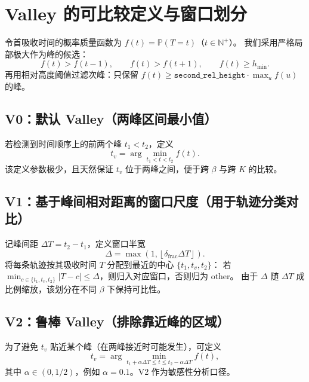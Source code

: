 \section{Valley 的可比较定义与窗口划分}

令首吸收时间的概率质量函数为 $f(t)=\mathbb{P}(T=t)$（$t\in\mathbb{N}^+$）。
我们采用严格局部极大作为峰的候选：
\begin{equation}
f(t)>f(t-1),\qquad f(t)>f(t+1),\qquad f(t)\ge h_{\min}.
\end{equation}
再用相对高度阈值过滤次峰：只保留 $f(t)\ge \texttt{second\_rel\_height}\cdot \max_{u} f(u)$ 的峰。

\subsection{V0：默认 Valley（两峰区间最小值）}
若检测到时间顺序上的前两个峰 $t_1<t_2$，定义
\begin{equation}
t_v=\arg\min_{t_1<t<t_2} f(t).
\end{equation}
该定义参数极少，且天然保证 $t_v$ 位于两峰之间，便于跨 $\beta$ 与跨 $K$ 的比较。

\subsection{V1：基于峰间相对距离的窗口尺度（用于轨迹分类对比）}
记峰间距 $\Delta T=t_2-t_1$，定义窗口半宽
\begin{equation}
\Delta=\max\left(1,\left\lfloor \delta_{\mathrm{frac}}\Delta T\right\rfloor\right).
\end{equation}
将每条轨迹按其吸收时间 $T$ 分配到最近的中心 $\{t_1,t_v,t_2\}$：
若 $\min_{c\in\{t_1,t_v,t_2\}} |T-c|\le \Delta$，则归入对应窗口，否则归为 other。
由于 $\Delta$ 随 $\Delta T$ 成比例缩放，该划分在不同 $\beta$ 下保持可比性。

\subsection{V2：鲁棒 Valley（排除靠近峰的区域）}
为了避免 $t_v$ 贴近某个峰（在两峰接近时可能发生），可定义
\begin{equation}
t_v=\arg\min_{t_1+\alpha\Delta T\le t\le t_2-\alpha\Delta T} f(t),
\end{equation}
其中 $\alpha\in(0,1/2)$，例如 $\alpha=0.1$。V2 作为敏感性分析口径。

